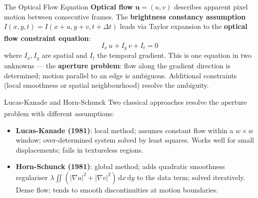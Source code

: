 \begin{v3topic}{The Optical Flow Equation}
    \textbf{Optical flow} $\mathbf{u}=(u,v)$ describes apparent pixel motion between consecutive frames.
    The \textbf{brightness constancy assumption} $I(x,y,t) = I(x+u, y+v, t+\Delta t)$ leads via Taylor expansion to the \textbf{optical flow constraint equation}\textsuperscript{\cite[][pp.~498--504]{szeliski2022}}:
    \begin{equation}
        I_x\,u + I_y\,v + I_t = 0
    \end{equation}
    where $I_x, I_y$ are spatial and $I_t$ the temporal gradient.
    This is one equation in two unknowns --- the \textbf{aperture problem}: flow along the gradient direction is determined; motion parallel to an edge is ambiguous.
    Additional constraints (local smoothness or spatial neighbourhood) resolve the ambiguity.

\end{v3topic}
\begin{v3topic}{Lucas-Kanade and Horn-Schunck}
    Two classical approaches resolve the aperture problem with different assumptions\textsuperscript{\cite[][pp.~504--510]{szeliski2022}}:
    \begin{itemize}
        \item \textbf{Lucas-Kanade (1981)}: local method; assumes constant flow within a $w{\times}w$ window; over-determined system solved by least squares.
          Works well for small displacements; fails in textureless regions.
        \item \textbf{Horn-Schunck (1981)}: global method; adds quadratic smoothness regulariser $\lambda\iint(|\nabla u|^2 + |\nabla v|^2)\,\mathrm{d}x\,\mathrm{d}y$ to the data term; solved iteratively.
          Dense flow; tends to smooth discontinuities at motion boundaries.
    \end{itemize}

\end{v3topic}
